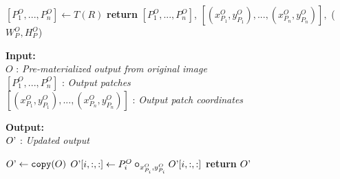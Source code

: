 \begin{algorithm}
\begin{algorithmic}[1]
    \State $[P^O_1,...,P^O_n] \gets T(R)$
    \State \textbf{return} $[P^O_1,...,P^O_n]$, $[(x^O_{P_1},y^O_{P_1}),...,(x^O_{P_n},y^O_{P_n})],$
    \State \hspace*{20mm} ($W^O_P,H^O_P$) 
    \EndProcedure
    \end{algorithmic}

    \vspace*{-2mm}
    \hrulefill
    
    \begin{flushleft}
     \hspace*{4mm} \textbf{Input:}\\
     \hspace*{8mm} $O$ : \textit{Pre-materialized output from original image}\\
     \hspace*{8mm} $[P^O_1,...,P^O_n]$ : \textit{Output patches}\\
     \hspace*{8mm} $[(x^O_{P_1},y^O_{P_1}),...,(x^O_{P_n},y^O_{P_n})]$ : \textit{Output patch coordinates}\\
    \end{flushleft}

    \begin{flushleft}
     \hspace*{4mm} \textbf{Output:}\\
     \hspace*{8mm} $O\textrm'$ : \textit{Updated output}
    \end{flushleft}
	\begin{algorithmic}[1]
    \State $O\textrm' \gets \texttt{copy}(O)$
    	\State $O\textrm'[i,:,:] \gets P^O_i \bm\circ_{x^O_{P_i},y^O_{P_i}} O\textrm'[i,:,:]$
    \EndFor
    \State \textbf{return} $O\textrm'$
    \EndProcedure

    \end{algorithmic}
\end{algorithm}


